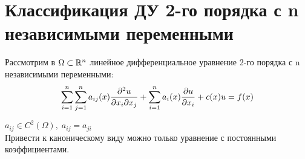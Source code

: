 \documentclass[../main.tex]{subfiles}
\begin{document}
\section{Классификация ДУ 2-го порядка с n независимыми переменными}

\par Рассмотрим в $\Omega \subset \mathbb{R}^n $ линейное дифференциальное уравнение 2-го порядка с n независимыми переменными:
\begin{equation}\label{eq:1.8.1}
	\sum_{i=1}^n\sum_{j=1}^n a_{ij}(x)\frac{\partial^2u}{\partial x_i \partial x_j} + \sum_{i=1}^n a_i(x) \frac{\partial u}{\partial x_i} + c(x)u = f(x)
 \end{equation}

$a_{ij} \in C^2(\Omega), \; a_{ij} = a_{ji} $
\\
Привести к каноническому виду можно только уравнение с постоянными коэффициентами.
\end{document}
